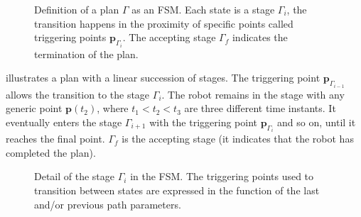 \begin{figure}[h!]
  \center
  \caption[Definition of a plan]{Definition of a plan $\Gamma$ as an FSM. Each state is a stage $\Gamma_i$, the transition happens in the proximity of specific points called triggering points $\mathbf{p}_{\Gamma_i}$. The accepting stage $\Gamma_f$ indicates the termination of the plan.}
  \label{fig:state-machine}
\end{figure}
 illustrates a plan with a linear succession of stages. The triggering point $\mathbf{p}_{\Gamma_{i-1}}$ allows the transition to the stage $\Gamma_i$. The robot remains in the stage with any generic point $\mathbf{p}(t_2)$, where $t_1<t_2<t_3$ are three different time instants. It eventually enters the stage $\Gamma_{i+1}$ with the triggering point $\mathbf{p}_{\Gamma_i}$ and so on, until it reaches the final point. $\Gamma_f$ is the accepting stage (it indicates that the robot has completed the plan).
\begin{figure}[h!]
  \center
  \caption[Detail of a stage in the FSM]{Detail of the stage $\Gamma_i$ in the FSM. The triggering points used to transition between states are expressed in the function of the last and/or previous path parameters.}
  \label{fig:state-machine2}
\end{figure}
